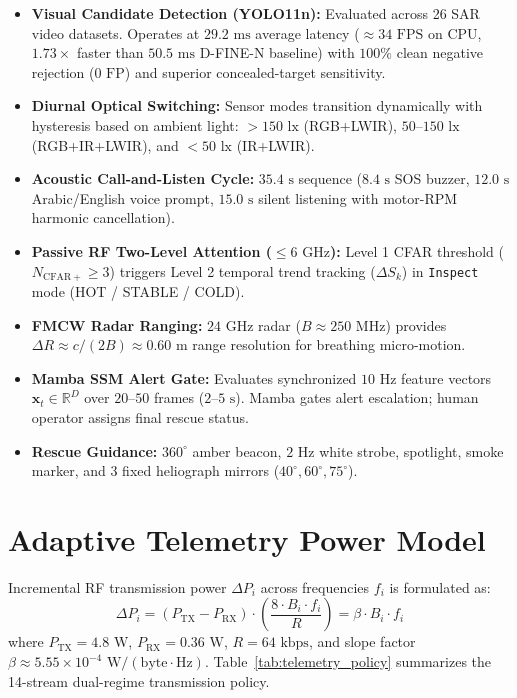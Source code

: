 \documentclass[conference]{IEEEtran}
\begin{document}
\begin{itemize}
    \item \textbf{Visual Candidate Detection (YOLO11n):} Evaluated across 26 SAR video datasets. Operates at $29.2\text{ ms}$ average latency ($\approx 34\text{ FPS}$ on CPU, $1.73\times$ faster than $50.5\text{ ms}$ D-FINE-N baseline) with $100\%$ clean negative rejection ($0\text{ FP}$) and superior concealed-target sensitivity.
    \item \textbf{Diurnal Optical Switching:} Sensor modes transition dynamically with hysteresis based on ambient light: $>150\text{ lx}$ (RGB+LWIR), $50\text{--}150\text{ lx}$ (RGB+IR+LWIR), and $<50\text{ lx}$ (IR+LWIR).
    \item \textbf{Acoustic Call-and-Listen Cycle:} $35.4\text{ s}$ sequence ($8.4\text{ s}$ SOS buzzer, $12.0\text{ s}$ Arabic/English voice prompt, $15.0\text{ s}$ silent listening with motor-RPM harmonic cancellation).
    \item \textbf{Passive RF Two-Level Attention ($\le 6\text{ GHz}$):} Level 1 CFAR threshold ($N_{\mathrm{CFAR+}} \ge 3$) triggers Level 2 temporal trend tracking ($\Delta S_k$) in \texttt{Inspect} mode (HOT / STABLE / COLD).
    \item \textbf{FMCW Radar Ranging:} $24\text{ GHz}$ radar ($B \approx 250\text{ MHz}$) provides $\Delta R \approx c/(2B) \approx 0.60\text{ m}$ range resolution for breathing micro-motion.
    \item \textbf{Mamba SSM Alert Gate:} Evaluates synchronized $10\text{ Hz}$ feature vectors $\mathbf{x}_t \in \mathbb{R}^D$ over $20\text{--}50$ frames ($2\text{--}5\text{ s}$). Mamba gates alert escalation; human operator assigns final rescue status.
    \item \textbf{Rescue Guidance:} $360^\circ$ amber beacon, $2\text{ Hz}$ white strobe, spotlight, smoke marker, and 3 fixed heliograph mirrors ($40^\circ, 60^\circ, 75^\circ$).
\end{itemize}

\section{Adaptive Telemetry Power Model}
Incremental RF transmission power $\Delta P_i$ across frequencies $f_i$ is formulated as:
\begin{equation}
\Delta P_i = (P_{\mathrm{TX}} - P_{\mathrm{RX}}) \cdot \left(\frac{8 \cdot B_i \cdot f_i}{R}\right) = \beta \cdot B_i \cdot f_i
\end{equation}
where $P_{\mathrm{TX}} = 4.8\text{ W}$, $P_{\mathrm{RX}} = 0.36\text{ W}$, $R = 64\text{ kbps}$, and slope factor $\beta \approx 5.55 \times 10^{-4}\text{ W}/(\text{byte}\cdot\text{Hz})$. Table~\ref{tab:telemetry_policy} summarizes the 14-stream dual-regime transmission policy.
\end{document}
